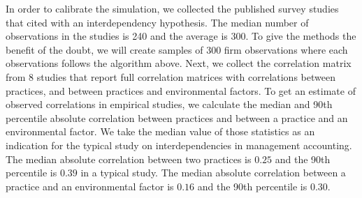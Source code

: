 \documentclass[12pt]{article}
\begin{document}
In order to calibrate the simulation, we collected the published survey studies that cited \citet{Grabner2013} with an interdependency hypothesis. The median number of observations in the studies is 240 and the average is 300. To give the methods the benefit of the doubt, we will create samples of 300 firm observations where each observations follows the algorithm above. Next, we collect the correlation matrix from 8 studies \citep{Dekker2016, Grabner2016, Bedford2015, Heinicke2016,Bedford2018PerformanceFirms, Abernethy2015a,Sponem2016ExploringApproach, Samagaio2018ManagementInvestigation} that report full correlation matrices with correlations between practices, and between practices and environmental factors. To get an estimate of observed correlations in empirical studies, we calculate the median and 90th percentile absolute correlation between practices and between a practice and an environmental factor. We take the median value of those statistics as an indication for the typical study on interdependencies in management accounting. The median absolute correlation between two practices is $0.25$ and the 90th percentile is $0.39$ in a typical study. The median absolute correlation between a practice and an environmental factor is $0.16$ and the 90th percentile is $0.30$.
\end{document}
